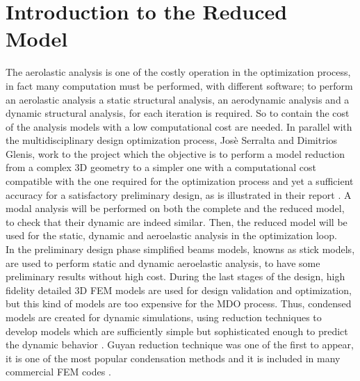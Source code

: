 \section{Introduction to the Reduced Model}
The aerolastic analysis is one of the costly operation in the optimization process, in fact many computation must be performed, with different software; to perform an aerolastic analysis a static structural analysis, an aerodynamic analysis and a dynamic structural analysis, for each iteration is required. So to contain the cost of the analysis models with a low computational cost are needed. In parallel with the multidisciplinary design optimization process, Josè Serralta and Dimitrios Glenis, work to the project which the objective is to perform a model reduction from a complex 3D geometry to a simpler one with a computational cost compatible with the one required for the optimization process and yet a sufficient accuracy for a satisfactory preliminary design, as is illustrated in their report \cite{bru}. A modal analysis will be performed on both the complete and the reduced model, to check that their dynamic are indeed similar. Then, the reduced model will be used for the static, dynamic and aeroelastic analysis in the optimization loop.\\
In the preliminary design phase simplified beams models, knowns as stick models, are used to perform static and dynamic aeroelastic analysis, to have some preliminary results without high cost. During the last stages of the design, high fidelity detailed 3D FEM models are used for design validation and optimization, but this kind of models are too expensive for the MDO process. Thus, condensed models are created for dynamic simulations, using reduction techniques to develop models which are sufficiently simple but sophisticated enough to predict the dynamic behavior \cite{bomb}. Guyan reduction technique was one of the first to appear, it is one of the most popular condensation methods and it is included in many commercial FEM codes \cite{ter}.
